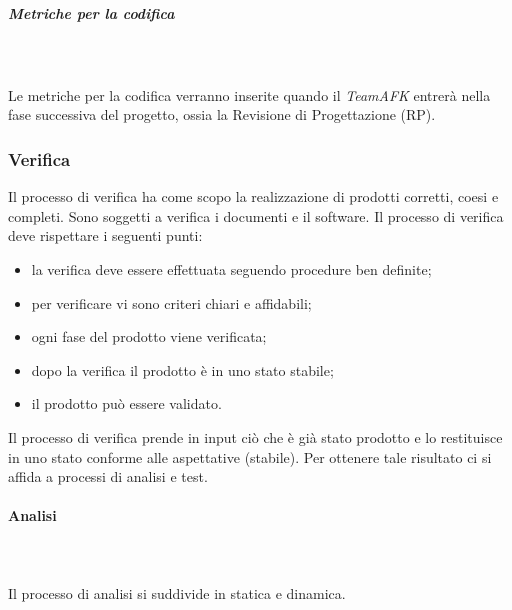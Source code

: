 \subparagraph{Metriche per la codifica} \mbox{} \\ \mbox{} \\
Le metriche per la codifica verranno inserite quando il \textit{TeamAFK} entrerà nella fase successiva del progetto, ossia la Revisione di Progettazione (RP).

\subsubsection{Verifica}
Il processo di verifica ha come scopo la realizzazione di prodotti corretti, coesi e completi. Sono soggetti a verifica i documenti e il software.
Il processo di verifica deve rispettare i seguenti punti: \begin{itemize}
\item la verifica deve essere effettuata seguendo procedure ben definite;
\item per verificare vi sono criteri chiari e affidabili;
\item ogni fase del prodotto viene verificata;
\item dopo la verifica il prodotto è in uno stato stabile;
\item il prodotto può essere validato.
\end{itemize}
Il processo di verifica prende in input ciò che è già stato prodotto e lo restituisce in uno stato
conforme alle aspettative (stabile). Per ottenere tale risultato ci si affida a processi di analisi e test.
\paragraph{Analisi} \mbox{} \\ \mbox{} \\
Il processo di analisi si suddivide in statica e dinamica.

